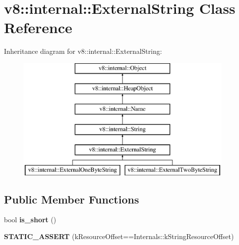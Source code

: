 \hypertarget{classv8_1_1internal_1_1_external_string}{}\section{v8\+:\+:internal\+:\+:External\+String Class Reference}
\label{classv8_1_1internal_1_1_external_string}
Inheritance diagram for v8\+:\+:internal\+:\+:External\+String\+:\begin{figure}[H]
\begin{center}
\leavevmode
\includegraphics[height=6.000000cm]{classv8_1_1internal_1_1_external_string}
\end{center}
\end{figure}
\subsection*{Public Member Functions}
\begin{DoxyCompactItemize}
\item 
bool {\bfseries is\+\_\+short} ()\hypertarget{classv8_1_1internal_1_1_external_string_aa01265ee74be4036b44f3b86865ff222}{}\label{classv8_1_1internal_1_1_external_string_aa01265ee74be4036b44f3b86865ff222}

\item 
{\bfseries S\+T\+A\+T\+I\+C\+\_\+\+A\+S\+S\+E\+RT} (k\+Resource\+Offset==Internals\+::k\+String\+Resource\+Offset)\hypertarget{classv8_1_1internal_1_1_external_string_aedeea945a222ae1a66308dbfecb8d970}{}\label{classv8_1_1internal_1_1_external_string_aedeea945a222ae1a66308dbfecb8d970}

\end{DoxyCompactItemize}
